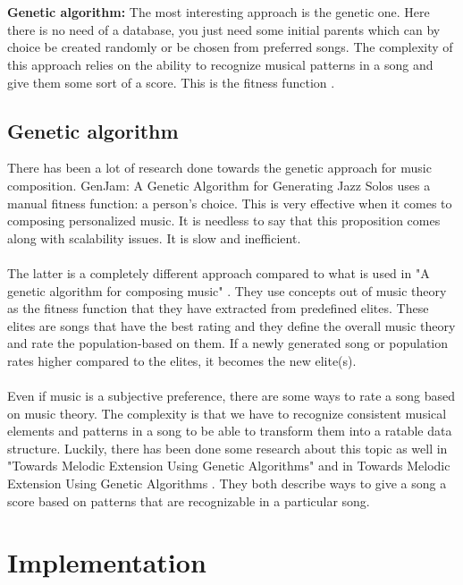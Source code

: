 \documentclass[a4paper]{article}
\begin{document}
\\\\
\textbf{Genetic algorithm:}
The most interesting approach is the genetic one. Here there is no need of a database, you just need some initial parents which can by choice be created randomly or be chosen from preferred songs. The complexity of this approach relies on the ability to recognize musical patterns in a song and give them some sort of a score. This is the fitness function\cite{magma} . 

\subsection{Genetic algorithm}
There has been a lot of research done towards the genetic approach for music composition. GenJam: A Genetic Algorithm for Generating Jazz Solos \cite{genjam} uses a manual fitness function: a person's choice. This is very effective when it comes to composing personalized music. It is needless to say that this proposition comes along with scalability issues. It is slow and inefficient.
\\\\
The latter is a completely different approach compared to what is used in "A genetic algorithm for composing music" \cite{genetic}. They use concepts out of music theory as the fitness function that they have extracted from predefined elites. These elites are songs that have the best rating and they define the overall music theory and rate the population-based on them. If a newly generated song or population rates higher compared to the elites, it becomes the new elite(s).
\\\\
Even if music is a subjective preference, there are some ways to rate a song based on music theory. The complexity is that we have to recognize consistent musical elements and patterns in a song to be able to transform them into a ratable data structure. Luckily, there has been done some research about this topic as well in "Towards Melodic Extension Using Genetic Algorithms" \cite{genmusictheory} and in Towards Melodic Extension Using Genetic Algorithms \cite{genmusicbach}. They both describe ways to give a song a score based on patterns that are recognizable in a particular song.


\section{Implementation}
\end{document}
